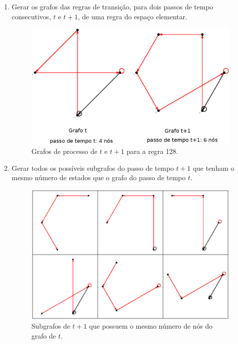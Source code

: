 \documentclass[12pt,a4paper]{article}
\begin{document}
\begin{enumerate}\label{sec:mikialgo}
\item Gerar os grafos das regras de transição, para dois passos de tempo
consecutivos, $t$ e $t+1$, de uma regra do espaço elementar.

\begin{figure}[H]
\begin{center}
\includegraphics[scale=0.3]{img/GraphT.eps}
\caption{Grafos de processo de $t$ e $t+1$ para a regra 128.}
\label{fig:grapht}
\end{center}
\end{figure}

\item Gerar todos os possíveis subgrafos do passo de tempo $t+1$ que tenham
o mesmo número de estados que o grafo do passo de tempo $t$.

\begin{figure}[H]
\begin{center}
\includegraphics[scale=0.7]{img/SubGraph.eps}
\caption{Subgrafos de $t+1$ que possuem o mesmo número de nós do grafo de $t$.}
\label{fig:subgraph}
\end{center}
\end{figure}


\end{enumerate}
\end{document}
